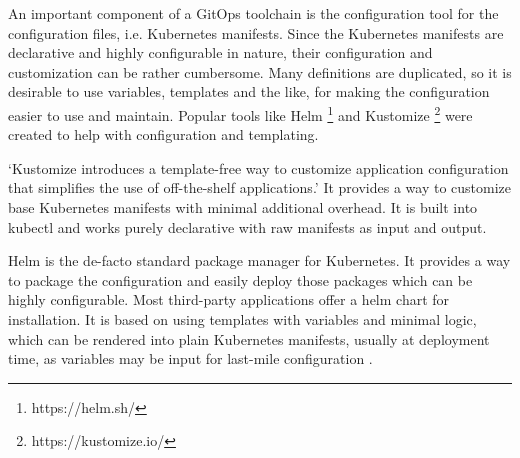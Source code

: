 


An important component of a GitOps toolchain is the configuration tool
for the configuration files, i.e. Kubernetes manifests.
Since the Kubernetes manifests are declarative and highly configurable in nature,
their configuration and customization can be rather cumbersome.
Many definitions are duplicated, so it is desirable to use variables, templates and the like,
for making the configuration easier to use and maintain.
Popular tools like Helm \footnote{https://helm.sh/} and Kustomize \footnote{https://kustomize.io/} were created to help with configuration and templating.

\enquote*{Kustomize introduces a template-free way to customize application configuration that simplifies the use of off-the-shelf applications.}
\autocite{kustomizeIoWebsite}
It provides a way to customize base Kubernetes manifests with minimal additional overhead.
It is built into kubectl and works purely declarative with raw manifests as input and output.

Helm is the de-facto standard package manager for Kubernetes.
It provides a way to package the configuration and easily deploy those packages
which can be highly configurable.
Most third-party applications offer a helm chart for installation.
It is based on using templates with variables and minimal logic,
which can be rendered into plain Kubernetes manifests, usually at deployment time,
as variables may be input for last-mile configuration
\autocite{helmWebsite}.

%









